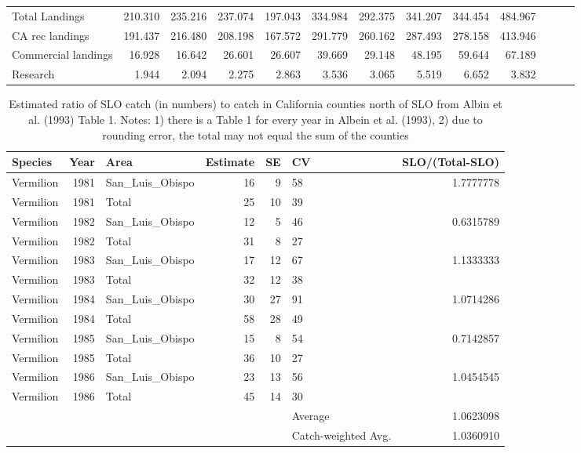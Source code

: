 \documentclass[
  english,
  a4paper,
]{article}
\begin{document}
\begin{table}
{\begin{tabular}[t]{lrrrrrrrrrrrr}
\hspace{1em}Total Landings & 210.310 & 235.216 & 237.074 & 197.043 & 334.984 & 292.375 & 341.207 & 344.454 & 484.967 &  &  & \\
\hspace{1em}CA rec landings & 191.437 & 216.480 & 208.198 & 167.572 & 291.779 & 260.162 & 287.493 & 278.158 & 413.946 &  &  & \\
\hspace{1em}Commercial landings & 16.928 & 16.642 & 26.601 & 26.607 & 39.669 & 29.148 & 48.195 & 59.644 & 67.189 &  &  & \\
\hspace{1em}Research & 1.944 & 2.094 & 2.275 & 2.863 & 3.536 & 3.065 & 5.519 & 6.652 & 3.832 &  &  & \\
\bottomrule
\end{tabular}}
\end{table}





\begin{table}

\caption{\label{tab:albin-allocate}Estimated ratio of SLO catch (in numbers) to catch in California 
  counties north of SLO from Albin et al. (1993) Table 1.  Notes: 1) there is a Table 
  1 for every year in Albein et al. (1993), 2) due to rounding error, the total may not 
  equal the sum of the counties}
\centering
\fontsize{10}{12}\selectfont
\begin{tabular}[t]{lrlrrlr}
\toprule
Species & Year & Area & Estimate & SE & CV & SLO/(Total-SLO)\\
\midrule
Vermilion & 1981 & San\_Luis\_Obispo & 16 & 9 & 58 & 1.7777778\\
Vermilion & 1981 & Total & 25 & 10 & 39 & \\
Vermilion & 1982 & San\_Luis\_Obispo & 12 & 5 & 46 & 0.6315789\\
Vermilion & 1982 & Total & 31 & 8 & 27 & \\
Vermilion & 1983 & San\_Luis\_Obispo & 17 & 12 & 67 & 1.1333333\\
\addlinespace
Vermilion & 1983 & Total & 32 & 12 & 38 & \\
Vermilion & 1984 & San\_Luis\_Obispo & 30 & 27 & 91 & 1.0714286\\
Vermilion & 1984 & Total & 58 & 28 & 49 & \\
Vermilion & 1985 & San\_Luis\_Obispo & 15 & 8 & 54 & 0.7142857\\
Vermilion & 1985 & Total & 36 & 10 & 27 & \\
\addlinespace
Vermilion & 1986 & San\_Luis\_Obispo & 23 & 13 & 56 & 1.0454545\\
Vermilion & 1986 & Total & 45 & 14 & 30 & \\
 &  &  &  &  & Average & 1.0623098\\
 &  &  &  &  & Catch-weighted Avg. & 1.0360910\\
\bottomrule
\end{tabular}
\end{table}
\end{document}

